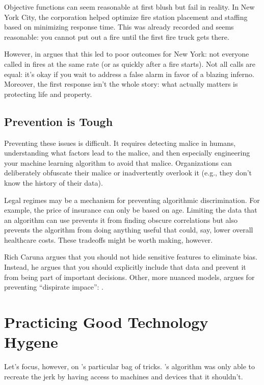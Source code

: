 Objective functions can seem reasonable at first blush but fail in
reality.  In New York City, the  corporation helped optimize
fire station placement and staffing based on minimizing response
time.  This was already recorded and seems reasonable: you cannot put
out a fire until the first fire truck gets there.

However, \citet{floot-11} in  argues that this led to poor
outcomes for New York: not everyone called in fires at the same rate
(or as quickly after a fire starts).  Not all calls are equal: it's
okay if you wait to address a false alarm in favor of a blazing
inferno.  Moreover, the first response isn't the whole story: what
actually matters is protecting life and property.  

\subsection{Prevention is Tough}

Preventing these issues is difficult.  It requires detecting malice in
humans, understanding what factors lead to the malice, and then
especially engineering your machine learning algorithm to avoid that
malice.  Organizations can deliberately obfuscate their malice or
inadvertently overlook it (e.g., they don't know the history of their
data).

Legal regimes may be a mechanism for preventing algorithmic
discrimination.  For example, the price of insurance can only be based
on age.  Limiting the data that an algorithm can use prevents it from
finding obscure correlations but also prevents the algorithm from
doing anything useful that could, say, lower overall healthcare costs.
These tradeoffs might be worth making, however.

Rich Caruna argues that you should not hide sensitive features to
eliminate bias.  Instead, he argues that you should explicitly include
that data and prevent it from being part of important decisions.
Other, more nuanced models, argues for preventing ``dispirate
impace'': .

\section{Practicing Good Technology Hygene}

Let's focus, however, on \energyJerk{}'s particular bag of tricks.
\energyCompany{}'s algorithm was only able to recreate the jerk by
having access to machines and devices that it shouldn't.

